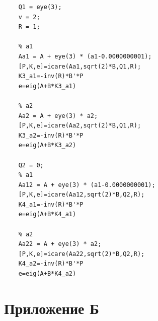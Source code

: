 \documentclass[a4paper, 12pt]{article}
\begin{document}
\begin{lstlisting}[label=task1code, caption={Программа для задания 1}]
    % solving Riccati
    Q1 = eye(3);
    v = 2;
    R = 1;

    % a1
    Aa1 = A + eye(3) * (a1-0.0000000001);
    [P,K,e]=icare(Aa1,sqrt(2)*B,Q1,R);
    K3_a1=-inv(R)*B'*P
    e=eig(A+B*K3_a1)

    % a2
    Aa2 = A + eye(3) * a2;
    [P,K,e]=icare(Aa2,sqrt(2)*B,Q1,R);
    K3_a2=-inv(R)*B'*P
    e=eig(A+B*K3_a2)

    Q2 = 0;
    % a1
    Aa12 = A + eye(3) * (a1-0.0000000001);
    [P,K,e]=icare(Aa12,sqrt(2)*B,Q2,R);
    K4_a1=-inv(R)*B'*P
    e=eig(A+B*K4_a1)

    % a2
    Aa22 = A + eye(3) * a2;
    [P,K,e]=icare(Aa22,sqrt(2)*B,Q2,R);
    K4_a2=-inv(R)*B'*P
    e=eig(A+B*K4_a2)
    \end{lstlisting}


    \section{Приложение Б}
\end{document}
